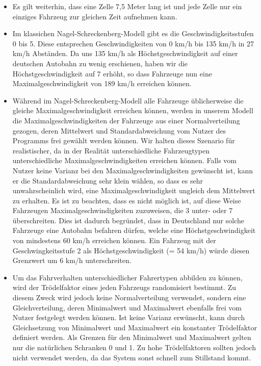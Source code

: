 \documentclass[11pt, a4paper]{article}
\newcommand\nsm{Nagel-Schreckenberg-Modell }
\begin{document}
\begin{itemize}
\item Es gilt weiterhin, dass eine Zelle 7,5 Meter lang ist und jede Zelle nur ein einziges Fahrzeug zur gleichen Zeit aufnehmen kann.
\item Im klassichen \nsm gibt es die Geschwindigkeitsstufen 0 bis 5. Diese entsprechen Geschwindigkeiten von 0 km/h bis 135 km/h in 27 km/h Abständen. Da uns 135 km/h als Höchstgeschwindigkeit auf einer deutschen Autobahn zu wenig erschienen, haben wir die Höchstgeschwindigkeit auf 7 erhöht, so dass Fahrzeuge nun eine Maximalgeschwindigkeit von 189 km/h erreichen können.
\item Während im \nsm alle Fahrzeuge üblicherweise die gleiche Maximalgeschwindigkeit erreichen können, werden in unserem Modell die Maximalgeschwindigkeiten der Fahrzeuge aus einer Normalverteilung gezogen, deren Mittelwert und Standardabweichung vom Nutzer des Programms frei gewählt werden können. Wir halten dieses Szenario für realistischer, da in der Realität unterschiedliche Fahrzeugtypen unterschiedliche Maximalgeschwindigkeiten erreichen können. Falls vom Nutzer keine Varianz bei den Maximalgeschwindigkeiten gewünscht ist, kann er die Standardabweichung sehr klein wählen, so dass es sehr unwahrscheinlich wird, eine Maximalgeschwindigkeit ungleich dem Mittelwert zu erhalten. Es ist zu beachten, dass es nicht möglich ist, auf diese Weise Fahrzeugen Maximalgeschwindigkeiten zuzuweisen, die 3 unter- oder 7 überschreiten. Dies ist dadurch begründet, dass in Deutschland nur solche Fahrzeuge eine Autobahn befahren dürfen, welche eine Höchstgeschwindigkeit von mindestens 60 km/h erreichen können. Ein Fahrzeug mit der Geschwingkeitsstufe 2 als Höchstgeschwindigkeit (= 54 km/h) würde diesen Grenzwert um 6 km/h unterschreiten.
\item Um das Fahrverhalten unterschiedlicher Fahrertypen abbilden zu können, wird der Trödelfaktor eines jeden Fahrzeugs randomisiert bestimmt. Zu diesem Zweck wird jedoch keine Normalverteilung verwendet, sondern eine Gleichverteilung, deren Minimalwert und Maximalwert ebenfalls frei vom Nutzer festgelegt werden können. Ist keine Varianz erwünscht, kann durch Gleichsetzung von Minimalwert und Maximalwert ein konstanter Trödelfaktor definiert werden. Als Grenzen für den Minimalwert und Maximalwert gelten nur die natürlichen Schranken 0 und 1. Zu hohe Trödelfaktoren sollten jedoch nicht verwendet werden, da das System sonst schnell zum Stillstand kommt.

\end{itemize}
\end{document}
